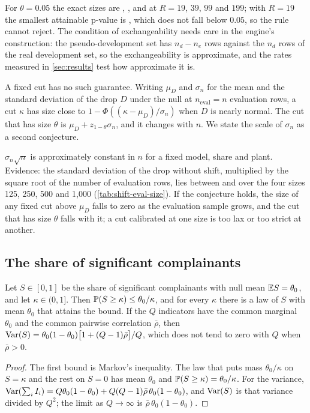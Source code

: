 For $\theta=0.05$ the exact sizes are \GranExactNineteen{}, \GranExactThirtyNine{}, \GranExactNinetyNine{} and \GranExactFull{} at $R=19$, $39$, $99$ and $199$; with $R=19$ the smallest attainable p-value is \GranSmallestNineteen{}, which does not fall below $0.05$, so the rule cannot reject. The condition of exchangeability needs care in the engine's construction: the pseudo-development set has $n_d-n_e$ rows against the $n_d$ rows of the real development set, so the exchangeability is approximate, and the rates measured in \cref{sec:results} test how approximate it is.

A fixed cut has no such guarantee. Writing $\mu_D$ and $\sigma_n$ for the mean and the standard deviation of the drop $D$ under the null at $n_{\mathrm{eval}}=n$ evaluation rows, a cut $\kappa$ has size close to $1-\Phi((\kappa-\mu_D)/\sigma_n)$ when $D$ is nearly normal. The cut that has size $\theta$ is $\mu_D+z_{1-\theta}\sigma_n$, and it changes with $n$. We state the scale of $\sigma_n$ as a second conjecture.

\begin{remark}
\label{conj:scale}
$\sigma_n\sqrt{n}$ is approximately constant in $n$ for a fixed model, share and plant. Evidence: the standard deviation of the drop without shift, multiplied by the square root of the number of evaluation rows, lies between \ShSdScaleMin{} and \ShSdScaleMax{} over the four sizes 125, 250, 500 and 1,000 (\cref{tab:shift-eval-size}). If the conjecture holds, the size of any fixed cut above $\mu_D$ falls to zero as the evaluation sample grows, and the cut that has size $\theta$ falls with it; a cut calibrated at one size is too lax or too strict at another.
\end{remark}

\subsection{The share of significant complainants}

\begin{proposition}
\label{prop:share}
Let $S\in[0,1]$ be the share of significant complainants with null mean $\mathbb{E} S=\theta_0$, and let $\kappa\in(0,1]$. Then $\mathbb{P}(S\ge\kappa)\le\theta_0/\kappa$, and for every $\kappa$ there is a law of $S$ with mean $\theta_0$ that attains the bound. If the $Q$ indicators have the common marginal $\theta_0$ and the common pairwise correlation $\bar\rho$, then $\operatorname{Var}(S)=\theta_0(1-\theta_0)\bigl[1+(Q-1)\bar\rho\bigr]/Q$, which does not tend to zero with $Q$ when $\bar\rho>0$.
\end{proposition}
\begin{proof}
The first bound is Markov's inequality. The law that puts mass $\theta_0/\kappa$ on $S=\kappa$ and the rest on $S=0$ has mean $\theta_0$ and $\mathbb{P}(S\ge\kappa)=\theta_0/\kappa$. For the variance, $\operatorname{Var}(\sum_iI_i)=Q\theta_0(1-\theta_0)+Q(Q-1)\bar\rho\,\theta_0(1-\theta_0)$, and $\operatorname{Var}(S)$ is that variance divided by $Q^2$; the limit as $Q\to\infty$ is $\bar\rho\,\theta_0(1-\theta_0)$.
\end{proof}

